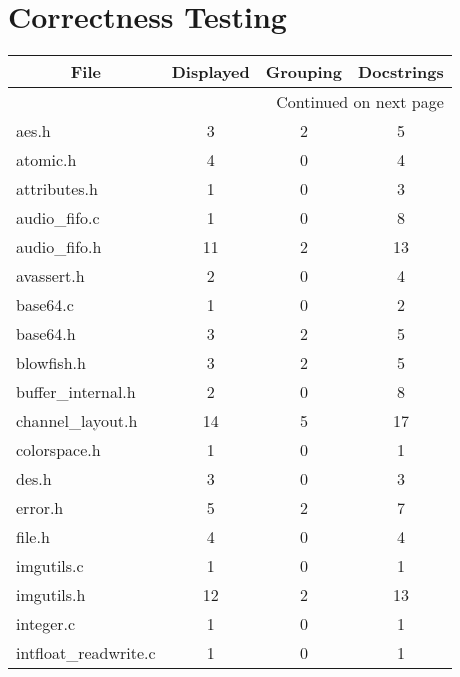 \section{Correctness Testing}
\begin{longtable}{l || c | c | c}
  \multicolumn{1}{c||}{File} & \multicolumn{1}{c|}{Displayed} & \multicolumn{1}{c|}{Grouping} & \multicolumn{1}{c}{Docstrings} \\
  \hline
  \endhead

  \hline \multicolumn{4}{r}{{Continued on next page}} \\
  \endfoot

  \endlastfoot

  aes.h                 & 3         & 2        & 5          \\
  atomic.h              & 4         & 0        & 4          \\
  attributes.h          & 1         & 0        & 3          \\
  audio\_fifo.c         & 1         & 0        & 8          \\
  audio\_fifo.h         & 11        & 2        & 13          \\
  avassert.h            & 2         & 0        & 4          \\
  base64.c              & 1         & 0        & 2          \\
  base64.h              & 3         & 2        & 5          \\
  blowfish.h            & 3         & 2        & 5          \\
  buffer\_internal.h    & 2         & 0        & 8          \\
  channel\_layout.h     & 14        & 5        & 17          \\
  colorspace.h          & 1         & 0        & 1          \\
  des.h                 & 3         & 0        & 3          \\
  error.h               & 5         & 2        & 7          \\
  file.h                & 4         & 0        & 4          \\
  imgutils.c            & 1         & 0        & 1          \\
  imgutils.h            & 12        & 2        & 13          \\
  integer.c             & 1         & 0        & 1          \\
  intfloat\_readwrite.c & 1         & 0        & 1          \\

\end{longtable}
